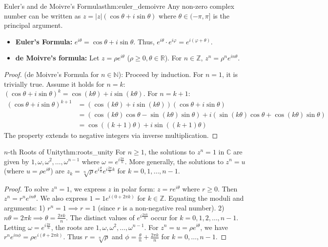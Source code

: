 \documentclass[11pt, a4paper]{article}
\begin{document}
\begin{theorem}{Euler's and de Moivre's Formulas}{thm:euler_demoivre}
Any non-zero complex number can be written as $z = |z|(\cos\theta + i\sin\theta)$ where $\theta \in (-\pi, \pi]$ is the principal argument.
\begin{itemize}
    \item \textbf{Euler's Formula:} $e^{i\theta} = \cos\theta + i\sin\theta$. Thus, $e^{i\theta} \cdot e^{i\varphi} = e^{i(\varphi+\theta)}$.
    \item \textbf{de Moivre's formula:} Let $z = \rho e^{i\theta}$ ($\rho \ge 0, \theta \in \mathbb{R}$). For $n \in \mathbb{Z}$, $z^n = \rho^n e^{in\theta}$.
\end{itemize}
\end{theorem}
\begin{proof}
(de Moivre's Formula for $n \in \mathbb{N}$): Proceed by induction. For $n=1$, it is trivially true.
Assume it holds for $n = k$: $(\cos\theta + i\sin\theta)^k = \cos(k\theta) + i\sin(k\theta)$.
For $n = k+1$:
\begin{align*}
(\cos\theta + i\sin\theta)^{k+1} &= (\cos(k\theta) + i\sin(k\theta))(\cos\theta + i\sin\theta) \\
&= (\cos(k\theta)\cos\theta - \sin(k\theta)\sin\theta) + i(\sin(k\theta)\cos\theta + \cos(k\theta)\sin\theta) \\
&= \cos((k+1)\theta) + i\sin((k+1)\theta)
\end{align*}
The property extends to negative integers via inverse multiplication.
\end{proof}

\begin{theorem}{$n$-th Roots of Unity}{thm:roots_unity}
For $n \ge 1$, the solutions to $z^n = 1$ in $\mathbb{C}$ are given by $1, \omega, \omega^2, \dots, \omega^{n-1}$ where $\omega = e^{i \frac{2\pi}{n}}$. 
More generally, the solutions to $z^n = u$ (where $u = \rho e^{i\theta}$) are $z_k = \sqrt[n]{\rho} e^{i\frac{\theta}{n}} e^{i\frac{2\pi}{n}k}$ for $k=0,1,\dots,n-1$.
\end{theorem}
\begin{proof}
To solve $z^n = 1$, we express $z$ in polar form: $z = r e^{i\theta}$ where $r \ge 0$.
Then $z^n = r^n e^{in\theta}$. We also express $1 = 1 e^{i(0 + 2\pi k)}$ for $k \in \mathbb{Z}$.
Equating the moduli and arguments:
1) $r^n = 1 \implies r = 1$ (since $r$ is a non-negative real number).
2) $n\theta = 2\pi k \implies \theta = \frac{2\pi k}{n}$.
The distinct values of $e^{i\frac{2\pi k}{n}}$ occur for $k = 0, 1, 2, \dots, n-1$. Letting $\omega = e^{i\frac{2\pi}{n}}$, the roots are $1, \omega, \omega^2, \dots, \omega^{n-1}$.
For $z^n = u = \rho e^{i\theta}$, we have $r^n e^{in\phi} = \rho e^{i(\theta + 2\pi k)}$.
Thus $r = \sqrt[n]{\rho}$ and $\phi = \frac{\theta}{n} + \frac{2\pi k}{n}$ for $k = 0, \dots, n-1$.
\end{proof}
\end{document}
